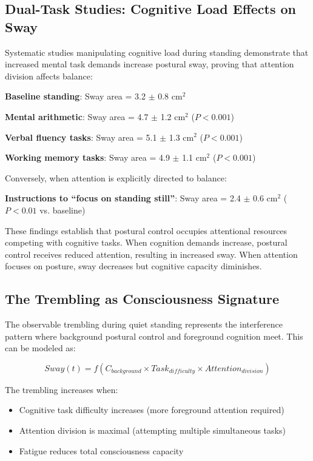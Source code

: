 \subsection{Dual-Task Studies: Cognitive Load Effects on Sway}

Systematic studies manipulating cognitive load during standing demonstrate that increased mental task demands increase postural sway, proving that attention division affects balance:

\textbf{Baseline standing}: Sway area = 3.2 $\pm$ 0.8 cm$^2$

\textbf{Mental arithmetic}: Sway area = 4.7 $\pm$ 1.2 cm$^2$ ($P < 0.001$) \citep{lajoie1993attentional}

\textbf{Verbal fluency tasks}: Sway area = 5.1 $\pm$ 1.3 cm$^2$ ($P < 0.001$)

\textbf{Working memory tasks}: Sway area = 4.9 $\pm$ 1.1 cm$^2$ ($P < 0.001$)

Conversely, when attention is explicitly directed to balance:

\textbf{Instructions to ``focus on standing still''}: Sway area = 2.4 $\pm$ 0.6 cm$^2$ ($P < 0.01$ vs. baseline)

These findings establish that postural control occupies attentional resources competing with cognitive tasks. When cognition demands increase, postural control receives reduced attention, resulting in increased sway. When attention focuses on posture, sway decreases but cognitive capacity diminishes.

\subsection{The Trembling as Consciousness Signature}

The observable trembling during quiet standing represents the interference pattern where background postural control and foreground cognition meet. This can be modeled as:

\begin{equation}
Sway(t) = f\left(C_{background} \times Task_{difficulty} \times Attention_{division}\right)
\end{equation}

The trembling increases when:
\begin{itemize}
\item Cognitive task difficulty increases (more foreground attention required)
\item Attention division is maximal (attempting multiple simultaneous tasks)
\item Fatigue reduces total consciousness capacity
\end{itemize}

